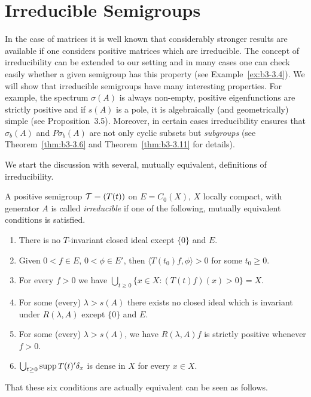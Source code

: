 \section{Irreducible Semigroups}%
In the case of matrices it is well known that considerably stronger results are available if one considers positive matrices which are irreducible. 
The concept of irreducibility can be extended to our setting and in many cases one can check easily whether a given semi­group has this property (see Example~\ref{ex:b3-3.4}). 
We will show that irreducible semigroups have many interesting properties. 
For example, the spectrum $\sigma(A)$ is always non-empty, positive eigenfunctions are strictly positive and if $s(A)$ is a pole, it is algebraically (and geometri­cally) simple (see Proposition~3.5). 
Moreover, in certain cases irreducibili­ty ensures that $\sigma_{b}(A)$ and $P\sigma_{b}(A)$ are not only cyclic subsets but \emph{subgroups} (see Theorem~\ref{thm:b3-3.6} and Theorem~\ref{thm:b3-3.11} for details). 

We start the discussion with several, mutually equivalent, definitions of irreducibility. 
\begin{definition}\label{def:b3-3.1}
A positive semigroup $\mathcal{T} = (T(t))$ on $E = C_{0}(X)$, $X$ locally compact, with generator $A$ is called \emph{irreducible} if one of the following, mutually equivalent conditions is satisfied.
\begin{enumerate}[\upshape (a)]

\item\label{item:b3-3.1-i}
There is no $T$-invariant closed ideal except $\{0\}$ and $E$.
	
\item\label{item:b3-3.1-ii}
Given $0 < f \in E$, $0 < \phi \in E'$, then $\langle T(t_{0})f,\phi \rangle > 0$ for some $t_{0} \geq 0$.
	
\item\label{item:b3-3.1-iii}
For every $f > 0$ we have 
$\bigcup_{t \geq 0}\{x \in X \colon (T(t)f)(x) > 0\} = X$.
	
\item\label{item:b3-3.1-iv}
For some (every) $\lambda > s(A)$ there exists no closed ideal which is invariant under $R(\lambda,A)$ except $\{0\}$ and $E$.
	
\item\label{item:b3-3.1-v}
For some (every) $\lambda > s(A)$, we have $R(\lambda,A)f$ is strictly positive whenever $f > 0$.
	
\item\label{item:b3-3.1-vi}
$\bigcup_{t \geq 0}\mathop{}\!\mathrm{supp}\, T(t)'\delta_{x}$ is dense in $X$ for every $x \in X$.

\end{enumerate}
\end{definition}
That these six conditions are actually equivalent can be seen as follows.

